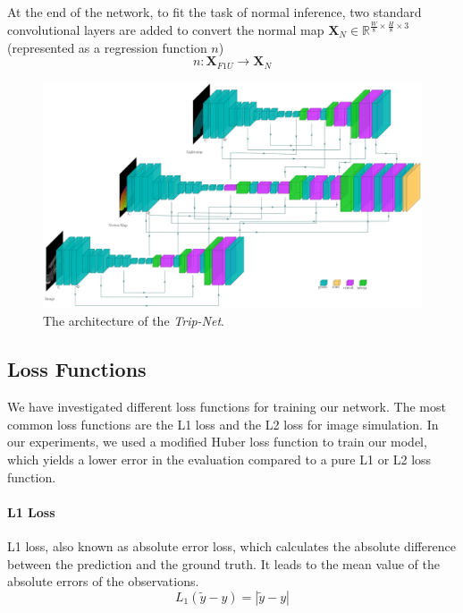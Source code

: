 At the end of the network, to fit the task of normal inference, two standard convolutional layers are added to convert the normal map $ \textbf{X}_{N} \in \mathbb{R}^{\frac{W}{8}\times \frac{H}{8}\times 3} $ (represented as a regression function $ n $)
\[n:\textbf{X}_{F1U} \rightarrow \textbf{X}_{N} \] 

\begin{figure}
	\centering
	\captionsetup{width=\linewidth}
	\includegraphics[width=\textwidth]{Figures/trignet} %
	\decoRule
	\caption{The architecture of the \textit{Trip-Net}.}
	\label{fig:Trip-Net}
\end{figure}




\subsection{Loss Functions}
We have investigated different loss functions for training our network. The most common loss functions are the L1 loss and the L2 loss for image simulation. In our experiments, we used a modified Huber loss function to train our model, which yields a lower error in the evaluation compared to a pure L1 or L2 loss function. 

\paragraph{L1 Loss}
L1 loss, also known as absolute error loss, which calculates the absolute difference between the prediction and the ground truth. It leads to the mean value of the absolute errors of the observations.
\[ L_1(\tilde y - y) = |\tilde y - y | \]

